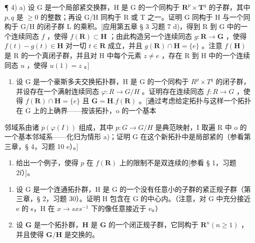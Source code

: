 ¶ 4) a) 设 G 是一个局部紧交换群，H 是 G 的一个同构于 \(\mathbf{R}^{p} \times \mathbf{T}^{q}\) 的子群，其中 \(p, q\) 是 \(\geqslant 0\) 的整数；再设 G/H 同构于 R 或 T 之一。证明 G 同构于 H 与一个同构于 G/H 的闭子群 L 的乘积。{[}应用第五章 § 3 习题 7 d)，得到 R 到 G 中的一个连续同态 \(f\) ，使得 \(f(\mathbf{R}) \subset \mathbf{H}\) ；由此构造另一个连续同态 \(g: \mathbf{R} \to \mathbf{G}\) ，使得 \(f(t) - g(t) \in \mathbf{H}\) 对一切 \(t \in \mathbf{R}\) 成立，并且 \(g(\mathbf{R}) \cap \mathbf{H} = \{e\}\) 。注意 \(f(\mathbf{H})\) 是 R 的一个真闭子群，并且对 H 中每个元素 \(z \neq e\) ，存在 R 到 H 中的一个连续同态 \(u\) ，使得 \(u(1) = z\) 。{]}

\begin{enumerate}
\def\labelenumi{\alph{enumi})}
\setcounter{enumi}{1}
\tightlist
\item
  设 G 是一个豪斯多夫交换拓扑群，H 是 G 的一个同构于 \(R^{p} \times T^{q}\) 的闭子群，并设存在一个满射连续同态 \(\varphi: R \to G/H\) 。证明存在连续同态 \(f: R \to G\) ，使得 \(f(\mathbf{R}) \cap \mathbf{H} = \{e\}\) 且 \(\mathbf{G} = \mathbf{H}. f(\mathbf{R})\) 。{[}通过考虑给定拓扑与这样一个拓扑在 G 上的上确界——按该拓扑，o 的一个基本
\end{enumerate}

邻域系由诸 \(\overline{p}(\varphi(I))\) 组成，其中 \(p:G\to G/H\) 是典范映射，I 取遍 R 中 o 的一个基本邻域系——化归为情形 a)；证明 G 在这个新拓扑中是局部紧的（参看第三章，§ 4，习题 10 e）。{]}

\begin{enumerate}
\def\labelenumi{\alph{enumi})}
\setcounter{enumi}{2}
\tightlist
\item
  给出一个例子，使得 \(p\) 在 \(f(\mathbf{R})\) 上的限制不是双连续的{[}参看 § 1，习题 2f）{]}。
\end{enumerate}

\begin{enumerate}
\def\labelenumi{\arabic{enumi})}
\setcounter{enumi}{4}
\item
  设 G 是一个连通拓扑群，H 是 G 的一个没有任意小的子群的紧正规子群（第三章，§ 2，习题 30）。证明 H 包含在 G 的中心内。（注意，对 G 中充分接近 e 的 s，H 在 \(x \rightarrow sxs^{-1}\) 下的像任意接近于 e。）
\item
  设 \(\mathbf{G}\) 是一个拓扑群，\(\mathbf{H}\) 是 \(\mathbf{G}\) 的一个闭正规子群，它同构于 \(\mathbf{R}^n (n\geqslant 1)\) ，并且使得 \(\mathbf{G} / \mathbf{H}\) 是交换的。
\end{enumerate}

